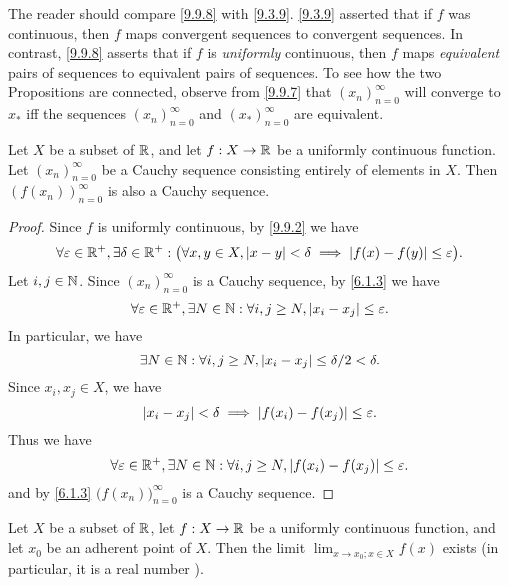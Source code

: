 \begin{rmk}\label{9.9.9}
  The reader should compare \cref{9.9.8} with \cref{9.3.9}.
  \cref{9.3.9} asserted that if \(f\) was continuous, then \(f\) maps convergent sequences to convergent sequences.
  In contrast, \cref{9.9.8} asserts that if \(f\) is \emph{uniformly} continuous, then \(f\) maps \emph{equivalent} pairs of sequences to equivalent pairs of sequences.
  To see how the two Propositions are connected, observe from \cref{9.9.7} that \((x_n)_{n = 0}^\infty\) will converge to \(x_*\) iff the sequences \((x_n)_{n = 0}^\infty\) and \((x_*)_{n = 0}^\infty\) are equivalent.
\end{rmk}

\setcounter{thm}{11}
\begin{prop}\label{9.9.12}
  Let \(X\) be a subset of \(\mathbb{R}\), and let \(f : X \to \mathbb{R}\) be a uniformly continuous function.
  Let \((x_n)_{n = 0}^\infty\) be a Cauchy sequence consisting entirely of elements in \(X\).
  Then \((f(x_n))_{n = 0}^\infty\) is also a Cauchy sequence.
\end{prop}

\begin{proof}
  Since \(f\) is uniformly continuous, by \cref{9.9.2} we have
  \[
    \forall \varepsilon \in \mathbb{R}^+, \exists \delta \in \mathbb{R}^+ : \big(\forall x, y \in X, \left\lvert x - y\right\rvert < \delta \implies \left\lvert f(x) - f(y)\right\rvert \leq \varepsilon\big).
  \]
  Let \(i, j \in \mathbb{N}\).
  Since \((x_n)_{n = 0}^\infty\) is a Cauchy sequence, by \cref{6.1.3} we have
  \[
    \forall \varepsilon \in \mathbb{R}^+, \exists N \in \mathbb{N} : \forall i, j \geq N, \left\lvert x_i - x_j\right\rvert \leq \varepsilon.
  \]
  In particular, we have
  \[
    \exists N \in \mathbb{N} : \forall i, j \geq N, \left\lvert x_i - x_j\right\rvert \leq \delta / 2 < \delta.
  \]
  Since \(x_i, x_j \in X\), we have
  \[
    \left\lvert x_i - x_j\right\rvert < \delta \implies \left\lvert f(x_i) - f(x_j)\right\rvert \leq \varepsilon.
  \]
  Thus we have
  \[
    \forall \varepsilon \in \mathbb{R}^+, \exists N \in \mathbb{N} : \forall i, j \geq N, \left\lvert f(x_i) - f(x_j)\right\rvert \leq \varepsilon.
  \]
  and by \cref{6.1.3} \(\big(f(x_n)\big)_{n = 0}^\infty\) is a Cauchy sequence.
\end{proof}

\setcounter{thm}{13}
\begin{cor}\label{9.9.14}
  Let \(X\) be a subset of \(\mathbb{R}\), let \(f : X \to \mathbb{R}\) be a uniformly continuous function, and let \(x_0\) be an adherent point of \(X\).
  Then the limit \(\lim_{x \to x_0 ; x \in X} f(x)\) exists
  (in particular, it is a real number ).
\end{cor}

